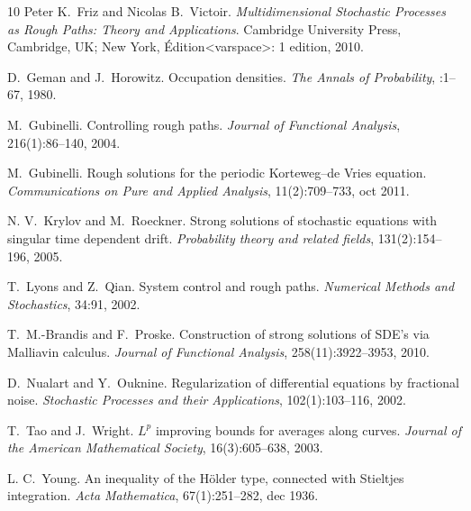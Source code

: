 \documentclass[a4paper,11pt]{article}
\newcommand{\tmtextit}[1]{{\itshape{#1}}}
\begin{document}
\begin{thebibliography}{10}
  Peter K.~Friz{{ and }}Nicolas
  B.~Victoir.{\newblock} \tmtextit{Multidimensional Stochastic Processes as
  Rough Paths: Theory and Applications}.{\newblock} Cambridge University
  Press, Cambridge, UK; New York, Édition<varspace>: 1{{ edition}},
  2010.{\newblock}
  
  D.~Geman{{ and
  }}J.~Horowitz.{\newblock} Occupation densities.{\newblock} \tmtextit{The
  Annals of Probability}, :1--67, 1980.{\newblock}
  
  M.~Gubinelli.{\newblock} Controlling
  rough paths.{\newblock} \tmtextit{Journal of Functional Analysis},
  216(1):86--140, 2004.{\newblock}
  
  M.~Gubinelli.{\newblock} Rough solutions for the
  periodic {K}orteweg--de {V}ries equation.{\newblock}
  \tmtextit{Communications on Pure and Applied Analysis}, 11(2):709--733, oct
  2011.{\newblock}
  
  N. V.~Krylov{{ and
  }}M.~Roeckner.{\newblock} Strong solutions of stochastic equations with
  singular time dependent drift.{\newblock} \tmtextit{Probability theory and
  related fields}, 131(2):154--196, 2005.{\newblock}
  
  T.~Lyons{{ and }}Z.~Qian.{\newblock}
  System control and rough paths.{\newblock} \tmtextit{Numerical Methods and
  Stochastics}, 34:91, 2002.{\newblock}
  
  T.~M.-Brandis{{ and
  }}F.~Proske.{\newblock} Construction of strong solutions of SDE's via
  Malliavin calculus.{\newblock} \tmtextit{Journal of Functional Analysis},
  258(11):3922--3953, 2010.{\newblock}
  
  D.~Nualart{{ and }}Y.~Ouknine.{\newblock}
  Regularization of differential equations by fractional noise.{\newblock}
  \tmtextit{Stochastic Processes and their Applications}, 102(1):103--116,
  2002.{\newblock}
  
  T.~Tao{{ and }}J.~Wright.{\newblock}
  $L^{p}$ improving bounds for averages along curves.{\newblock}
  \tmtextit{Journal of the American Mathematical Society}, 16(3):605--638,
  2003.{\newblock}
  
  L. C.~Young.{\newblock} An inequality of the Hölder
  type, connected with Stieltjes integration.{\newblock} \tmtextit{Acta
  Mathematica}, 67(1):251--282, dec 1936.{\newblock}
\end{thebibliography}
\end{document}
